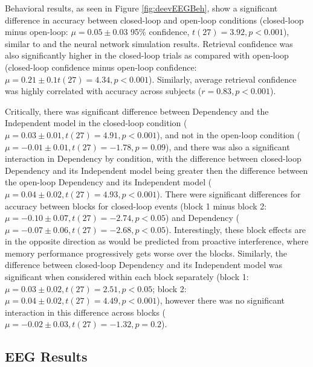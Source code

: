 \documentclass[11pt, titlepage, twoside]{article}
\begin{document}
Behavioral results, as seen in Figure \ref{fig:deevEEGBeh}, show a significant difference in accuracy between closed-loop and open-loop conditions (closed-loop minus open-loop: $\mu=0.05\pm0.03$ 95\% confidence, $t(27)=3.92, p<0.001$), similar to \textcite{HornerBisbyBushEtAl15} and the neural network simulation results.  Retrieval confidence was also significantly higher in the closed-loop trials as compared with open-loop (closed-loop confidence minus open-loop confidence: $\mu=0.21\pm0.1 t(27)=4.34, p<0.001$).  Similarly, average retrieval confidence was highly correlated with accuracy across subjects ($r=0.83,p<0.001$).

Critically, there was significant difference between Dependency and the Independent model in the closed-loop condition ($\mu=0.03\pm0.01, t(27)=4.91, p<0.001$), and not in the open-loop condition ($\mu=-0.01\pm0.01, t(27)=-1.78, p=0.09$), and there was also a significant interaction in Dependency by condition, with the difference between closed-loop Dependency and its Independent model being greater then the difference between the open-loop Dependency and its Independent model ($\mu=0.04\pm0.02, t(27)=4.93, p<0.001$).  There were significant differences for accuracy between blocks for closed-loop events (block 1 minus block 2: $\mu=-0.10\pm0.07, t(27)=-2.74, p<0.05$) and Dependency ($\mu=-0.07\pm0.06, t(27)=-2.68, p<0.05$).  Interestingly, these block effects are in the opposite direction as would be predicted from proactive interference, where memory performance progressively gets worse over the blocks.  Similarly, the difference between closed-loop Dependency and its Independent model was significant when considered within each block separately (block 1: $\mu=0.03\pm0.02, t(27)=2.51, p<0.05$; block 2: $\mu=0.04\pm0.02, t(27)=4.49, p<0.001$), however there was no significant interaction in this difference across blocks ($\mu=-0.02\pm0.03, t(27)=-1.32, p=0.2$).


\subsection{EEG Results}\label{sec:eegresults}
\end{document}
